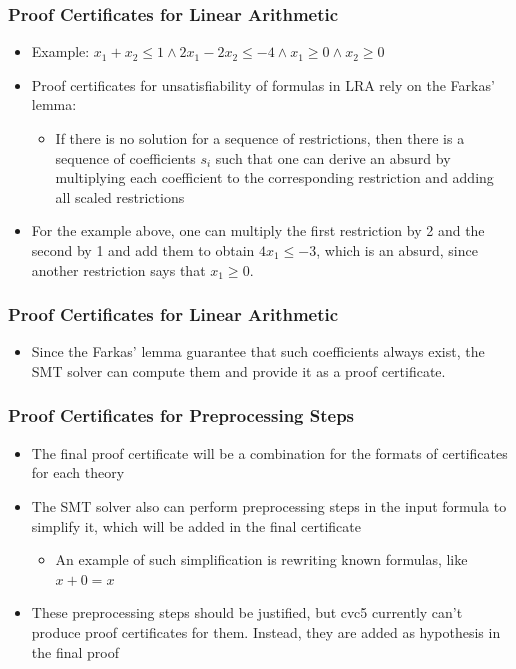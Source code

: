 \documentclass[usepdftitle=false,aspectratio=169,usenames,dvipsnames]{beamer}
\newcommand\vitem{\vfill\item}
\begin{document}
\begin{frame}
  \frametitle{Proof Certificates for Linear Arithmetic}
  \begin{itemize}
    \item Example: $x_{1} + x_{2} \le 1 \wedge 2x_{1} - 2x_{2} \le -4 \wedge x_{1} \ge 0 \wedge x_{2} \ge 0$
    \vitem Proof certificates for unsatisfiability of formulas in LRA rely on the Farkas' lemma:
    \begin{itemize}
      \item If there is no solution for a sequence of restrictions, then there is a sequence of coefficients $s_{i}$ such that one can derive an absurd by multiplying each coefficient to the corresponding restriction and adding all scaled restrictions
    \end{itemize}
    \vitem For the example above, one can multiply the first restriction by 2 and the second by 1 and add them to obtain $4x_{1} \le -3$, which is an absurd, since another restriction says that $x_{1} \ge 0$.
  \end{itemize}
\end{frame}

\begin{frame}
  \frametitle{Proof Certificates for Linear Arithmetic}
  \begin{itemize}
    \item Since the Farkas' lemma guarantee that such coefficients always exist, the SMT solver can compute them and provide it as a proof certificate.
  \end{itemize}
\end{frame}

\begin{frame}
  \frametitle{Proof Certificates for Preprocessing Steps}
  \begin{itemize}
    \item The final proof certificate will be a combination for the formats of certificates for each theory
    \vitem The SMT solver also can perform preprocessing steps in the input formula to simplify it, which will be added in the final certificate
    \begin{itemize}
      \item An example of such simplification is rewriting known formulas, like $x + 0 = x$
    \end{itemize}
    \vitem These preprocessing steps should be justified, but cvc5 currently can't produce proof certificates for them. Instead, they are added as hypothesis in the final proof
  \end{itemize}
\end{frame}
\end{document}
